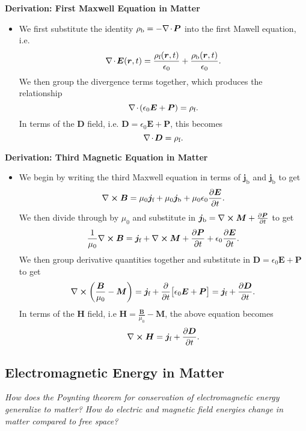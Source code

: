 \documentclass[11pt, a4paper]{article}
\renewcommand{\vec}[1]{\bm{#1}} %
\renewcommand{\r}{\vec{r}}
\newcommand{\E}{\vec{E}} %
\newcommand{\D}{\vec{D}}  %
\newcommand{\B}{\vec{B}} %
\renewcommand{\H}{\vec{H}}  %
\renewcommand{\P}{\vec{P}}  %
\newcommand{\M}{\vec{M}}  %
\newcommand{\ee}{\epsilon_{0}}  %
\newcommand{\mm}{\mu_{0}}  %
\renewcommand{\j}{\vec{j}}  %
\renewcommand{\div}{\nabla \mspace{-2mu} \cdot \mspace{-2mu}}
\renewcommand{\curl}{\nabla \cross}
\begin{document}
\textbf{Derivation: First Maxwell Equation in Matter}
\begin{itemize}
    \item We first substitute the identity $ \rho_{\text{b}} = - \div \P $ into the first Mawell equation, i.e.
    \begin{equation*}
        \div \E (\r, t) = \frac{\rho_{\text{f}}(\r, t)}{\ee} + \frac{\rho_{\text{b}}(\r, t)}{\ee}.
    \end{equation*}
    We then group the divergence terms together, which produces the relationship
    \begin{equation*}
        \div (\ee \E + \P) = \rho_{\text{f}}.
    \end{equation*}
    In terms of the $ \D $ field, i.e. $ \D = \ee \E + \P $, this becomes
    \begin{equation*}
        \div \D = \rho_{\text{f}}.
    \end{equation*}
\end{itemize}

\textbf{Derivation: Third Magnetic Equation in Matter}
\begin{itemize}
    \item We begin by writing the third Maxwell equation in terms of $ \j_{\text{b}} $ and $ \j_{\text{b}} $ to get
    \begin{equation*}
        \curl \B = \mm \j_{\text{f}} + \mm \j_{\text{b}} + \mm \ee \pdv{\E}{t}.
    \end{equation*}
    We then divide through by $ \mm $ and substitute in $ \j_{\text{b}} = \curl \M + \pdv{\P}{t} $ to get
    \begin{equation*}
        \frac{1}{\mm} \curl \B = \j_{\text{f}} + \curl \M + \pdv{\P}{t} + \ee \pdv{\E}{t}.
    \end{equation*}
    We then group derivative quantities together and substitute in $ \D = \ee \E + \P $ to get
    \begin{equation*}
        \curl \left( \frac{\B}{\mm} - \M \right) = \j_{\text{f}} + \pdv{t}\big[ \ee \E + \P \big] = \j_{\text{f}} + \pdv{\D}{t}.
    \end{equation*}
    In terms of the $ \H $ field, i.e $ \H = \frac{\B}{\mm} - \M $, the above equation becomes
    \begin{equation*}
        \curl \H = \j_{\text{f}} + \pdv{\D}{t}.
    \end{equation*}
\end{itemize}

    
\subsection{Electromagnetic Energy in Matter}
\textit{How does the Poynting theorem for conservation of electromagnetic energy generalize to matter? How do electric and magnetic field energies change in matter compared to free space?}
\end{document}
